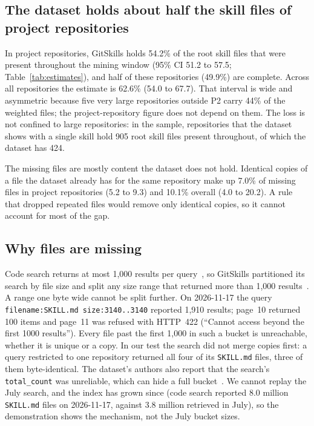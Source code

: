 
\subsection{The dataset holds about half the skill files of project repositories}
\label{sec:coverage}

In project repositories, GitSkills holds 54.2\% of the root skill files that were present throughout the mining
window (95\% CI 51.2 to 57.5; Table~\ref{tab:estimates}), and half of these repositories (49.9\%) are complete.
Across all repositories the estimate is 62.6\% (54.0 to 67.7). That interval is wide and asymmetric because five very
large repositories outside P2 carry 44\% of the weighted files; the project-repository figure does not depend on
them. The loss is not confined to large repositories: in the sample, repositories that the dataset shows with a
single skill hold 905 root skill files present throughout, of which the dataset has 424.

The missing files are mostly content the dataset does not hold. Identical copies of a file the dataset already has
for the same repository make up 7.0\% of missing files in project repositories (5.2 to 9.3) and 10.1\% overall
(4.0 to 20.2). A rule that dropped repeated files would remove only identical copies, so it cannot account for most of
the gap.

\subsection{Why files are missing}
\label{sec:cause}

Code search returns at most 1,000 results per query~\cite{github-search}, so GitSkills partitioned its search by file
size and split any size range that returned more than 1,000 results~\cite{gitskills}. A range one byte wide cannot be
split further. On 2026-11-17 the query \texttt{filename:SKILL.md size:3140..3140} reported 1,910 results; page~10
returned 100 items and page~11 was refused with HTTP~422 (``Cannot access beyond the first 1000 results''). Every file
past the first 1,000 in such a bucket is unreachable, whether it is unique or a copy. In our test the search did not
merge copies first: a query restricted to one repository returned all four of its \texttt{SKILL.md} files, three of
them byte-identical. The dataset's authors also report that the search's \texttt{total\_count} was unreliable, which
can hide a full bucket~\cite{gitskills}. We cannot replay the July search, and the index has grown since (code search
reported 8.0 million \texttt{SKILL.md} files on 2026-11-17, against 3.8 million retrieved in July), so the
demonstration shows the mechanism, not the July bucket sizes.

